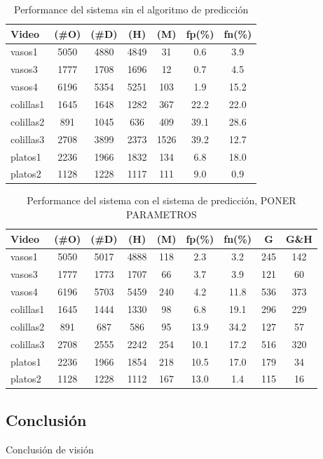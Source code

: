 \begin{table}[htb]
  \begin{tabular}{|l | c | c | c | c | c | c |}
	\hline  
	\textbf{Video} & \textbf{(\#O)} &  \textbf{(\#D)} & \textbf{(H)} & \textbf{(M)} & \textbf{fp(\%)} & \textbf{fn(\%)} \\
	\hline
	\hline
	vasos1 & 5050 & 4880 & 4849 & 31 & 0.6 & 3.9 \\
	vasos3 & 1777 & 1708 & 1696 & 12 & 0.7 & 4.5 \\
	vasos4 & 6196 & 5354 & 5251 & 103 & 1.9 & 15.2 \\
	\hline
	colillas1 & 1645 & 1648 & 1282 & 367 & 22.2 & 22.0 \\
	colillas2 & 891 & 1045 & 636 &  409 & 39.1 & 28.6 \\
	colillas3 & 2708 & 3899 & 2373 & 1526 & 39.2 & 12.7 \\
	\hline
	platos1 & 2236 & 1966 & 1832 & 134 & 6.8 & 18.0\\
	platos2 & 1128 & 1228 & 1117 & 111& 9.0 & 0.9\\
	\hline
	\end{tabular}
	\label{tab:result}
	\caption{Performance del sistema sin el algoritmo de predicción}
\end{table}

\begin{table}[htb]
  \begin{tabular}{|l | c | c | c | c | c | c | c | c |}
	\hline  
	\textbf{Video} & \textbf{(\#O)} &  \textbf{(\#D)} & \textbf{(H)} & \textbf{(M)} & \textbf{fp(\%)} & \textbf{fn(\%)} & \textbf{G} & \textbf{G\&H} \\
	\hline
	\hline
	vasos1 & 5050 & 5017 & 4888 & 118 & 2.3 & 3.2  & 245 & 142\\
	vasos3 & 1777 & 1773 & 1707 & 66 & 3.7 & 3.9 & 121 & 60 \\
	vasos4 & 6196 & 5703 & 5459 & 240 & 4.2 & 11.8 & 536 & 373 \\
	\hline
	colillas1 & 1645 & 1444 & 1330 & 98 & 6.8 & 19.1 & 296 & 229 \\
	colillas2 & 891 & 687 & 586 & 95 & 13.9 & 34.2 & 127 & 57 \\
	colillas3 & 2708 & 2555 & 2242 & 254 & 10.1 & 17.2  & 516 & 320\\
	\hline
	platos1 & 2236 & 1966 & 1854 & 218 & 10.5 & 17.0 & 179 & 34\\
	platos2 & 1128 & 1228 & 1112 & 167& 13.0 & 1.4 & 115 & 16\\
	\hline
	\end{tabular}
	\label{tab:result_pred}
	\caption{Performance del sistema con el sistema de predicción, PONER PARAMETROS}
\end{table}

	
\subsection{Conclusi\'on}
Conclusi\'on de visi\'on

